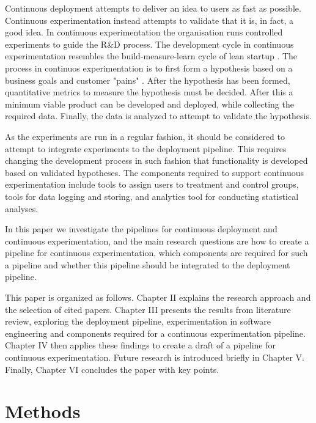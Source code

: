 \documentclass[conference]{IEEEtran}
\begin{document}
Continuous deployment attempts to deliver an idea to users as fast as possible. Continuous experimentation instead attempts to validate that it is, in fact, a good idea. In continuous experimentation the organisation runs controlled experiments to guide the R\&D process. The development cycle in continuous experimentation resembles the build-measure-learn cycle of lean startup \cite{ries2011lean}. The process in continuos experimentation is to first form a hypothesis based on a business goals and customer "pains" \cite{bosch2012building}. After the hypothesis has been formed, quantitative metrics to measure the hypothesis must be decided. After this a minimum viable product can be developed and deployed, while collecting the required data. Finally, the data is analyzed to attempt to validate the hypothesis.

As the experiments are run in a regular fashion, it should be considered to attempt to integrate experiments to the deployment pipeline. This requires changing the development process in such fashion that functionality is developed based on validated hypotheses. The components required to support continuous experimentation include tools to assign users to treatment and control groups, tools for data logging and storing, and analytics tool for conducting statistical analyses.

In this paper we investigate the pipelines for continuous deployment and continuous experimentation, and the main research questions are how to create a pipeline for continuous experimentation, which components are required for such a pipeline and whether this pipeline should be integrated to the deployment pipeline. 

This paper is organized as follows. Chapter II explains the research approach and the selection of cited papers. Chapter III presents the results from literature review, exploring the deployment pipeline, experimentation in software engineering and components required for a continuous experimentation pipeline. Chapter IV then applies these findings to create a draft of a pipeline for continuous experimentation. Future research is introduced briefly in Chapter V. Finally, Chapter VI concludes the paper with key points.

\section{Methods} %
\end{document}

